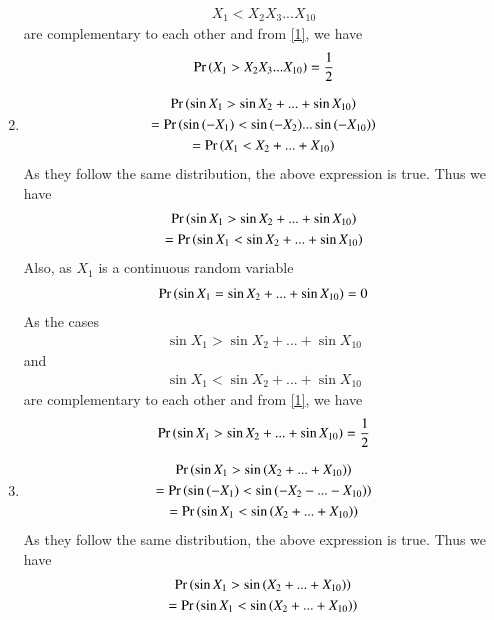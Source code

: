 \documentclass[journal,12pt,twocolumn]{IEEEtran}
\begin{document}
\begin{enumerate}[label = (\Alph*)]
\begin{align}
         {X_1<X_2X_3...X_{10}}
     \end{align}are complementary to each other and from \eqref{1}, we have 
        \begin{align}
         \Pr\left(X_1>X_2X_3...X_{10}\right)=\frac{1}{2}   
        \end{align}
\item \begin{multline}
        \Pr\left(\sin{X_1}>\sin{X_2}+...+\sin{X_{10}}\right)\\=\Pr\left(\sin{(-X_1)}<\sin{(-X_2)}...\sin{(-X_{10})}\right)\\
        =\Pr\left(X_1<X_2+...+X_{10}\right)
    \end{multline}
    As they follow the same distribution, the above expression is true.
    Thus we have
    \begin{multline}\label{1}
    \Pr\left(\sin{X_1}>\sin{X_2}+...+\sin{X_{10}}\right)\\
        =\Pr\left(\sin{X_1}<\sin{X_2}+...+\sin{X_{10}}\right)    
    \end{multline}
    Also, as $X_1$ is a continuous random variable
    \begin{align}
       \Pr\left(\sin{X_1}=\sin{X_2}+...+\sin{X_{10}}\right)=0
    \end{align}
     As the cases
     \begin{align}
      {\sin{X_1}>\sin{X_2}+...+\sin{X_{10}}}   
     \end{align}and 
     \begin{align}
         {\sin{X_1}<\sin{X_2}+...+\sin{X_{10}}}
     \end{align}are complementary to each other and from \eqref{1}, we have 
        \begin{align}
         \Pr\left(\sin{X_1}>\sin{X_2}+...+\sin{X_{10}}\right)=\frac{1}{2}   
        \end{align}
\item \begin{multline}
        \Pr\left(\sin{X_1}>\sin{(X_2+...+X_{10})}\right)\\=\Pr\left(\sin{(-X_1)}<\sin{(-X_2-...-X_{10})}\right)\\
        =\Pr\left(\sin{X_1}<\sin{(X_2+...+X_{10})}\right)
    \end{multline}
    As they follow the same distribution, the above expression is true.
    Thus we have
    \begin{multline}\label{1}
    \Pr\left(\sin{X_1}>\sin{(X_2+...+X_{10}})\right)\\
        =\Pr\left(\sin{X_1}<\sin{(X_2+...+X_{10}})\right)    
    \end{multline}

\end{enumerate}
\end{document}
